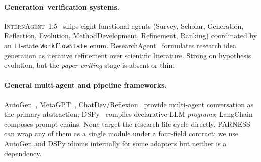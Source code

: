 \documentclass{article}
\newcommand{\parness}{\textsf{PARNESS}}
\newcommand{\code}[1]{\texttt{\small #1}}
\begin{document}
\paragraph{Generation--verification systems.}
\textsc{InternAgent}~1.5~\cite{internagent} ships eight functional
agents (Survey, Scholar, Generation, Reflection, Evolution,
MethodDevelopment, Refinement, Ranking) coordinated by an $11$-state
\code{WorkflowState} enum. ResearchAgent~\cite{researchagent} formulates
research idea generation as iterative refinement over scientific
literature. Strong on hypothesis evolution, but the \emph{paper writing}
stage is absent or thin.

\paragraph{General multi-agent and pipeline frameworks.}
AutoGen~\cite{autogen}, MetaGPT~\cite{metagpt}, ChatDev/Reflexion~\cite{reflexion}
provide multi-agent conversation as the primary abstraction; DSPy~\cite{dspy}
compiles declarative LLM \emph{programs}; LangChain composes prompt chains.
None target the research life-cycle directly. \parness{} can wrap any of
them as a single module under a four-field contract; we use AutoGen and
DSPy idioms internally for some adapters but neither is a dependency.
\end{document}

